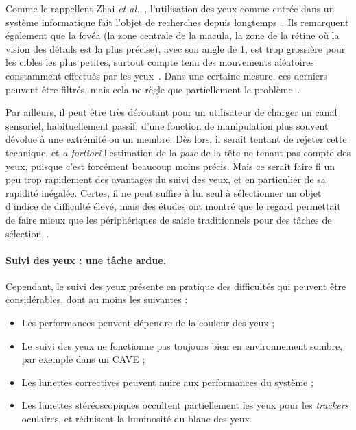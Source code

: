 	Comme le rappellent Zhai \emph{et al.}~\cite{zhai1999manual}, l'utilisation des yeux comme entrée dans un système informatique fait l'objet de recherches depuis longtemps~\cite{levine1981eye, bolt1982eyes, ware1987evaluation, jacob1990you}. Ils remarquent également que la fovéa (la zone centrale de la macula, la zone de la rétine où la vision des détails est la plus précise), avec son angle de 1\textdegree{}, est trop grossière pour les cibles les plus petites, surtout compte tenu des mouvements aléatoires constamment effectués par les yeux~\cite{monden2005evaluation, vspakov2011comparison}. Dans une certaine mesure, ces derniers peuvent être filtrés, mais cela ne règle que partiellement le problème~\cite{zhang2008improving}.
	
	Par ailleurs, il peut être très déroutant pour un utilisateur de \og charger \fg{} un canal sensoriel, habituellement passif,\footnotemark{} d'une fonction de manipulation plus souvent dévolue à une extrémité ou un membre. Dès lors, il serait tentant de rejeter cette technique, et \emph{a fortiori} l'estimation de la \emph{pose} de la tête ne tenant pas compte des yeux, puisque c'est forcément beaucoup moins précis. Mais ce serait faire fi un peu trop rapidement des avantages du suivi des yeux, et en particulier de sa rapidité inégalée. Certes, il ne peut suffire à lui seul à sélectionner un objet d'indice de difficulté élevé, mais des études ont montré que le regard permettait de faire mieux que les périphériques de saisie traditionnels pour des tâches de sélection~\cite{stellmach2012look, ware1987evaluation, smith2000hand, bieg2010eye}.
	
	
	\paragraph{Suivi des yeux : une tâche ardue.}

	Cependant, le suivi des yeux présente en pratique des difficultés qui peuvent être considérables, dont au moins les suivantes :
	
	\begin{itemize}
		\item Les performances peuvent dépendre de la couleur des yeux ;
		\item Le suivi des yeux ne fonctionne pas toujours bien en environnement sombre, par exemple dans un CAVE ;
		\item Les lunettes correctives peuvent nuire aux performances du système ;
		\item Les lunettes stéréoscopiques occultent partiellement les yeux pour les \emph{trackers} oculaires, et réduisent la luminosité du blanc des yeux.
	\end{itemize}

